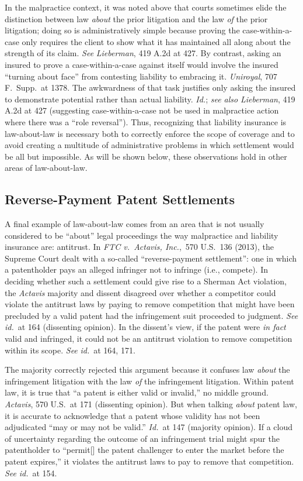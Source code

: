 \documentclass[
  12pt,
  letterpaper,
]{scrartcl}
\begin{document}
In the malpractice context, it was noted above that courts sometimes elide the
distinction between law \textit{about} the prior litigation and the law
\textit{of} the prior litigation; doing so is administratively simple because
proving the case-within-a-case only requires the client to show what it has
maintained all along about the strength of its claim. \textit{See}
\textit{Lieberman}, 419 A.2d at 427. By contrast, asking an insured to prove a
case-within-a-case against itself would involve the insured ``turning about
face'' from contesting liability to embracing it. \textit{Uniroyal}, 707
F.~Supp.~at 1378. The awkwardness of that task justifies only asking the
insured to demonstrate potential rather than actual liability. \textit{Id.};
\textit{see also} \textit{Lieberman}, 419 A.2d at 427 (suggesting
case-within-a-case not be used in malpractice action where there was a ``role
reversal''). Thus, recognizing that liability insurance is law-about-law is
necessary both to correctly enforce the scope of coverage and to avoid creating
a multitude of administrative problems in which settlement would be all but
impossible. As will be shown below, these observations hold in other areas of
law-about-law.


\subsection{Reverse-Payment Patent Settlements}

A final example of law-about-law comes from an area that is not usually
considered to be ``about'' legal proceedings the way malpractice and liability
insurance are: antitrust. In \textit{FTC v.~Actavis, Inc.},~570 U.S.~136
(2013), the Supreme Court dealt with a so-called ``reverse-payment
settlement'': one in which a patentholder pays an alleged infringer not to
infringe (i.e., compete). In deciding whether such a settlement could give rise to a Sherman Act
violation, the \textit{Actavis} majority and dissent disagreed over whether a
competitor could violate the antitrust laws by paying to remove competition
that might have been precluded by a valid patent had the infringement suit
proceeded to judgment. \textit{See} \textit{id.}~at 164 (dissenting opinion).
In the dissent's view, if the patent were \emph{in fact} valid and infringed,
it could not be an antitrust violation to remove competition within its scope.
\textit{See} \textit{id.}~at 164, 171.

The majority correctly rejected this argument because it confuses law
\textit{about} the infringement litigation with the law \textit{of} the
infringement litigation. Within patent law, it is true that ``a patent is
either valid or invalid,'' no middle ground. \textit{Actavis}, 570 U.S.~at 171
(dissenting opinion). But when talking \textit{about} patent law, it is
accurate to acknowledge that a patent whose validity has not been adjudicated
``may or may not be valid.'' \textit{Id.}~at 147 (majority opinion). If a cloud
of uncertainty regarding the outcome of an infringement trial might spur the
patentholder to ``permit[] the patent challenger to enter the market before the
patent expires,'' it violates the antitrust laws to pay to remove that
competition. \textit{See} \textit{id.}~at 154.
\end{document}
